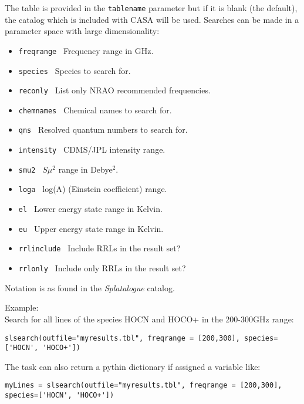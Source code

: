 The table is provided in the {\tt tablename} parameter but if it is
blank (the default), the catalog which is included with CASA will be
used. Searches can be made in a parameter space with large
dimensionality: 

\begin{itemize}

\item {\tt freqrange     } Frequency range in GHz.
\item {\tt species       } Species to search for.
\item {\tt reconly       } List only NRAO recommended frequencies.
\item {\tt chemnames     } Chemical names to search for.
\item {\tt qns           } Resolved quantum numbers to search for.
\item {\tt intensity     } CDMS/JPL intensity range. 
\item {\tt smu2          } $S\mu^{2}$ range in Debye$^{2}$. 
\item {\tt loga          } log(A) (Einstein coefficient) range. 
\item {\tt el            } Lower energy state range in Kelvin. 
\item {\tt eu            } Upper energy state range in Kelvin.
\item {\tt rrlinclude    } Include RRLs in the result set?
\item {\tt rrlonly       } Include only RRLs in the result set?
\end{itemize}

Notation is as found in the {\it Splatalogue} catalog. 

Example:\\
Search for all lines of the species HOCN and HOCO+ in the 200-300GHz range:
\small
\begin{verbatim}
slsearch(outfile="myresults.tbl", freqrange = [200,300], species=['HOCN', 'HOCO+'])
\end{verbatim}
\normalsize

The task can also return a pythin dictionary if assigned a variable
like:

\begin{verbatim}
myLines = slsearch(outfile="myresults.tbl", freqrange = [200,300], species=['HOCN', 'HOCO+'])
\end{verbatim}
\normalsize





